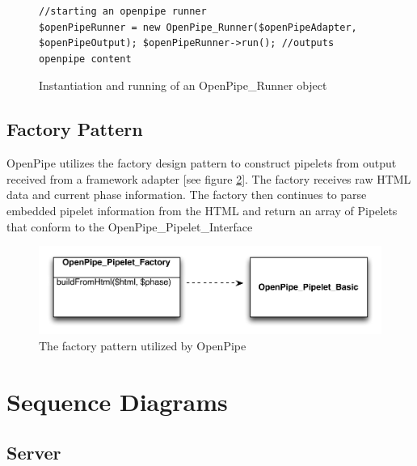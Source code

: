 \documentclass[12pt]{report}
\begin{document}
\begin{figure}[H]
\caption{Instantiation and running of an OpenPipe\_Runner object}
\label{fig:strategyRunnerCode}
\begin{lstlisting}
//starting an openpipe runner
$openPipeRunner = new OpenPipe_Runner($openPipeAdapter, $openPipeOutput); $openPipeRunner->run(); //outputs openpipe content
\end{lstlisting}
\end{figure}


\section{Factory Pattern}

OpenPipe utilizes the factory design pattern to construct pipelets from output received from a framework adapter [see figure \ref{fig:factoryPattern}]. The factory receives raw HTML data and current phase information. The factory then continues to parse embedded pipelet information from the HTML and return an array of Pipelets that conform to the OpenPipe\_Pipelet\_Interface 

\begin{figure}[H]
\caption{The factory pattern utilized by OpenPipe}
\label{fig:factoryPattern}
\centering
\includegraphics[width=\textwidth,keepaspectratio]{figures/images/factory_pipelets.pdf}
\end{figure}




\chapter{Sequence Diagrams}

\section{Server}
\end{document}
